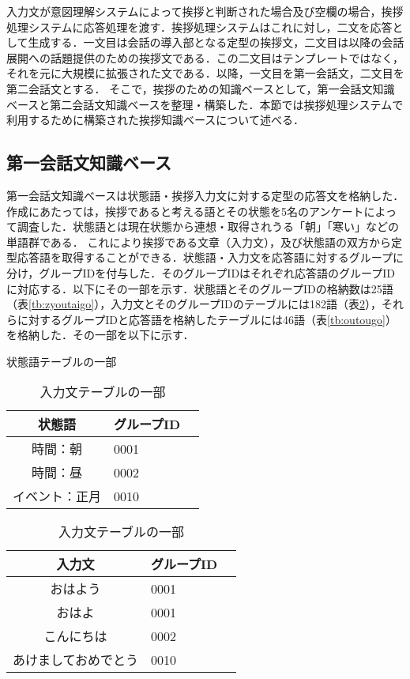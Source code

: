 入力文が意図理解システムによって挨拶と判断された場合及び空欄の場合，挨拶処理システムに応答処理を渡す．挨拶処理システムはこれに対し，二文を応答として生成する．一文目は会話の導入部となる定型の挨拶文，二文目は以降の会話展開への話題提供のための挨拶文である．この二文目はテンプレートではなく，それを元に大規模に拡張された文である．以降，一文目を第一会話文，二文目を第二会話文とする．
そこで，挨拶のための知識ベースとして，第一会話文知識ベースと第二会話文知識ベースを整理・構築した．本節では挨拶処理システムで利用するために構築された挨拶知識ベースについて述べる．

\subsection{第一会話文知識ベース}
第一会話文知識ベースは状態語・挨拶入力文に対する定型の応答文を格納した．作成にあたっては，挨拶であると考える語とその状態を5名のアンケートによって調査した．状態語とは現在状態から連想・取得されうる「朝」「寒い」などの単語群である．
これにより挨拶である文章（入力文），及び状態語の双方から定型応答語を取得することができる．状態語・入力文を応答語に対するグループに分け，グループIDを付与した．そのグループIDはそれぞれ応答語のグループIDに対応する．以下にその一部を示す．状態語とそのグループIDの格納数は25語（表\ref{tb:zyoutaigo}），入力文とそのグループIDのテーブルには182語（表\ref{tb:nyuryoku}），それらに対するグループIDと応答語を格納したテーブルには46語（表\ref{tb:outougo}）を格納した．その一部を以下に示す．
\begin{table}[htbp]
  \begin{minipage}{.48\linewidth}
    \begin{center}
      \caption{状態語テーブルの一部}
      \label{tb:zyoutaigo}
      \begin{tabular}{clc}
        \hline
        状態語 			& グループID \\
        \hline
        時間：朝 		& 0001 \\
        時間：昼 		& 0002 \\
        イベント：正月 	& 0010 \\
        \hline
      \end{tabular}
    \end{center}
  \end{minipage}
  \begin{minipage}{.48\linewidth}
    \begin{center}
      \caption{入力文テーブルの一部}
      \label{tb:nyuryoku}
      \begin{tabular}{clc}
        \hline
        入力文 & グループID \\
        \hline
        おはよう 	& 0001 \\
        おはよ 		& 0001 \\
        こんにちは 	& 0002 \\
        あけましておめでとう & 0010 \\
        \hline
      \end{tabular}
    \end{center}
    \end{minipage}
\end{table}

